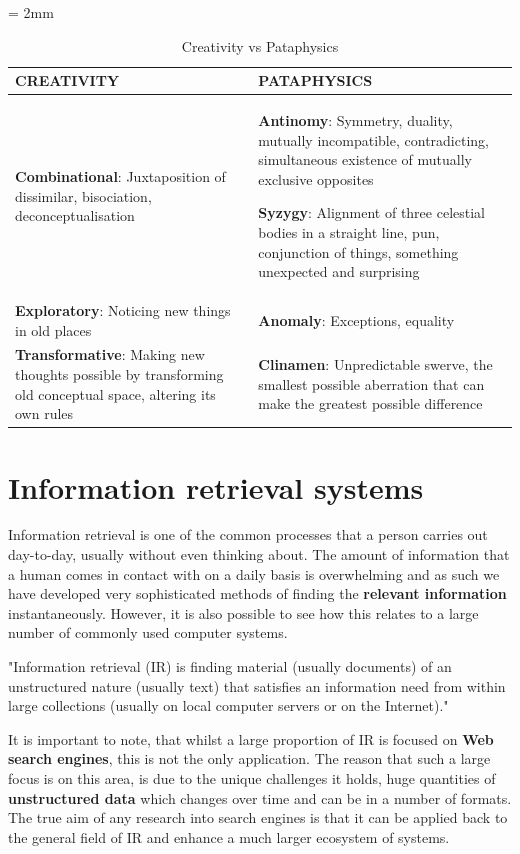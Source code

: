 \begin{table}
\everyrow{\hrule}
\tabulinesep = 2mm
\begin{tabu}{|X|X|}
\textbf{CREATIVITY} & \textbf{PATAPHYSICS} \\
\hline

\textbf{Combinational}: Juxtaposition of dissimilar, bisociation, deconceptualisation &
\textbf{Antinomy}: Symmetry, duality, mutually incompatible, contradicting, simultaneous existence of mutually exclusive opposites\par
\textbf{Syzygy}: Alignment of three celestial bodies in a
straight line, pun, conjunction of things, something unexpected
and surprising \\

\textbf{Exploratory}: Noticing new things in old places &
\textbf{Anomaly}: Exceptions, equality \\

\textbf{Transformative}: Making new thoughts possible by transforming old conceptual space, altering its own rules &
\textbf{Clinamen}: Unpredictable swerve, the smallest possible aberration that can make the greatest possible difference \\
\end{tabu}
\caption[Creativity vs Pataphysics]{Creativity vs Pataphysics}
\label{tab:creatpata}
\end{table}

\section{Information retrieval systems}

Information retrieval is one of the common processes that a person carries out day-to-day, usually without even thinking about. The amount of information that a human comes in contact with on a daily basis is overwhelming and as such we have developed very sophisticated methods of finding the \textbf{relevant information} instantaneously. However, it is also possible to see how this relates to a large number of commonly used computer systems.

"Information retrieval (IR) is finding material (usually documents) of an unstructured nature (usually text) that satisfies an information need from within large collections (usually on local computer servers or on the Internet)." \citep{Nickerson1999}

It is important to note, that whilst a large proportion of IR is focused on \textbf{Web search engines}, this is not the only application. The reason that such a large focus is on this area, is due to the unique challenges it holds, huge quantities of \textbf{unstructured data} which changes over time and can be in a number of formats. The true aim of any research into search engines is that it can be applied back to the general field of IR and enhance a much larger ecosystem of systems.

